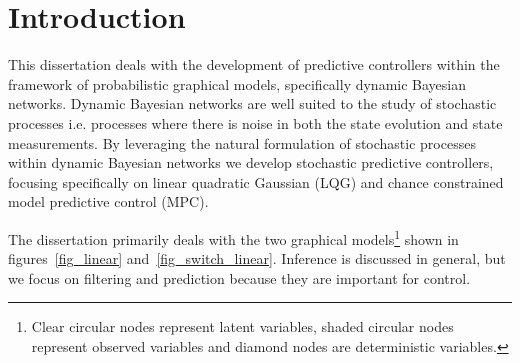 \chapter{Introduction}
This dissertation deals with the development of predictive controllers within the framework of probabilistic graphical models, specifically dynamic Bayesian networks. Dynamic Bayesian networks are well suited to the study of stochastic processes i.e. processes where there is noise in both the state evolution and state measurements. By leveraging the natural formulation of stochastic processes within dynamic Bayesian networks we develop stochastic predictive controllers, focusing specifically on linear quadratic Gaussian (LQG) and chance constrained model predictive control (MPC).

The dissertation primarily deals with the two graphical models\footnote{Clear circular nodes represent latent variables, shaded circular nodes represent observed variables and diamond nodes are deterministic variables.} shown in figures~\ref{fig_linear} and~\ref{fig_switch_linear}. Inference is discussed in general, but we focus on filtering and prediction because they are important for control. 
